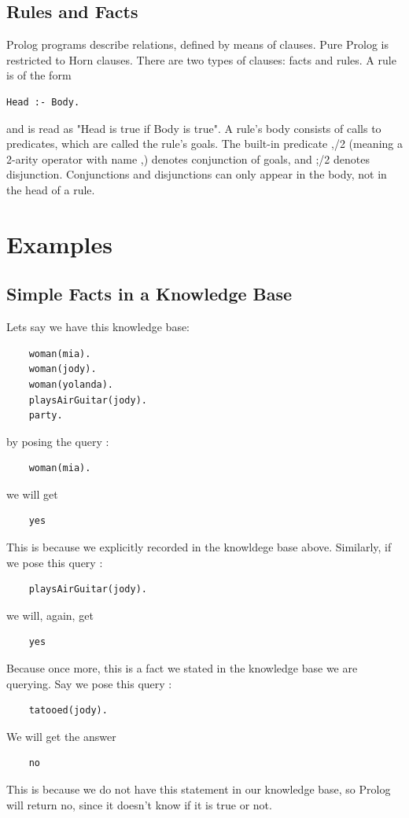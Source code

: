 \documentclass[14pt]{article}
\begin{document}
\subsection{Rules and Facts}
Prolog programs describe relations, defined by means of clauses. Pure Prolog is restricted to Horn clauses. There are two types of clauses: facts and rules. A rule is of the form
\begin{verbatim}Head :- Body.\end{verbatim}
and is read as "Head is true if Body is true". A rule's body consists 
of calls to predicates, which are called the rule's goals. The built-in predicate ,/2 (meaning a 2-arity operator with name ,) denotes conjunction of goals, and ;/2 denotes disjunction. Conjunctions and disjunctions can only appear in the body, not in the head of a rule.

\newpage
\section{Examples}
\subsection{Simple Facts in a Knowledge Base}
Lets say we have this knowledge base:
\begin{verbatim}
	woman(mia).
	woman(jody).
	woman(yolanda).
	playsAirGuitar(jody).
	party.
\end{verbatim}
by posing the query :
\begin{verbatim}
	woman(mia).
\end{verbatim}
we will get
\begin{verbatim}	yes\end{verbatim}
This is because we 
explicitly recorded in the knowldege base above. Similarly, if we 
pose this query :
\begin{verbatim}
	playsAirGuitar(jody).
\end{verbatim} 
we will, again, get
\begin{verbatim}	yes\end{verbatim}
Because once more, this is a fact we stated in the knowledge base we are 
querying.
Say we pose this query :
\begin{verbatim}
	tatooed(jody).
\end{verbatim}
We will get the answer
\begin{verbatim}	no\end{verbatim}
This is 
because we do not have this statement in our knowledge base, so Prolog
will return no, since it doesn't know if it is true or not.
\newpage 
\end{document}
